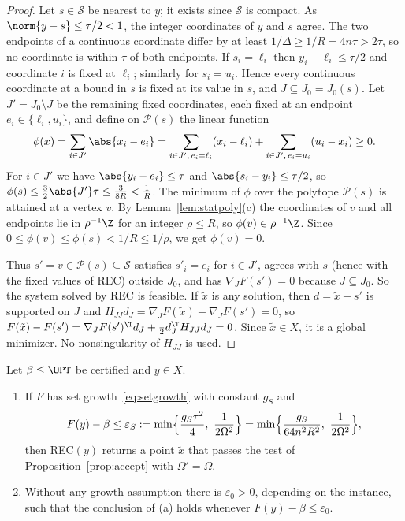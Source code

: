 \begin{proof}
Let $s\in\mathcal S$ be nearest to $y$; it exists since $\mathcal S$ is
compact. As $\norm{y-s}\le\tau/2<1$, the integer coordinates of $y$ and $s$
agree. The two endpoints of a continuous coordinate differ by at least
$1/\Delta\ge1/R=4n\tau>2\tau$, so no coordinate is within $\tau$ of both
endpoints. If $s_i=\ell_i$ then $y_i-\ell_i\le\tau/2$ and coordinate $i$ is
fixed at $\ell_i$; similarly for $s_i=u_i$. Hence every continuous coordinate
at a bound in $s$ is fixed at its value in $s$, and $J\subseteq J_0=J_0(s)$.
Let $J'=J_0\setminus J$ be the remaining fixed coordinates, each fixed at an
endpoint $e_i\in\{\ell_i,u_i\}$, and define on $\mathcal P(s)$ the linear
function
\[
\phi(x)=\sum_{i\in J'}\abs{x_i-e_i}
=\sum_{i\in J',\,e_i=\ell_i}(x_i-\ell_i)+\sum_{i\in J',\,e_i=u_i}(u_i-x_i)\ge0 .
\]
For $i\in J'$ we have $\abs{y_i-e_i}\le\tau$ and $\abs{s_i-y_i}\le\tau/2$, so
$\phi(s)\le\frac32\abs{J'}\tau\le\frac3{8R}<\frac1R$. The minimum of $\phi$
over the polytope $\mathcal P(s)$ is attained at a vertex $v$. By
Lemma~\ref{lem:statpoly}(c) the coordinates of $v$ and all endpoints lie in
$\rho^{-1}\Z$ for an integer $\rho\le R$, so $\phi(v)\in\rho^{-1}\Z$.
Since $0\le\phi(v)\le\phi(s)<1/R\le1/\rho$, we get $\phi(v)=0$.

Thus $s'=v\in\mathcal P(s)\subseteq\mathcal S$ satisfies $s'_i=e_i$ for
$i\in J'$, agrees with $s$ (hence with the fixed values of REC) outside $J_0$,
and has $\nabla_JF(s')=0$ because $J\subseteq J_0$. So the system solved by
REC is feasible. If $\tilde x$ is any solution, then $d=\tilde x-s'$ is
supported on $J$ and $H_{JJ}d_J=\nabla_JF(\tilde x)-\nabla_JF(s')=0$, so
$F(\tilde x)-F(s')=\nabla_JF(s')^{\T}d_J+\frac12d_J^{\T}H_{JJ}d_J=0$.
Since $\tilde x\in X$, it is a global minimizer. No nonsingularity of
$H_{JJ}$ is used.
\end{proof}

\begin{theorem}\label{thm:transfer}
Let $\beta\le\OPT$ be certified and $y\in X$.
\begin{enumerate}[label=(\alph*)]
\item If $F$ has set growth~\eqref{eq:setgrowth} with constant $g_S$ and
\begin{equation}\label{eq:transfer-threshold}
F(y)-\beta\le\varepsilon_S:=\min\Bigl\{\frac{g_S\tau^2}{4},\
\frac1{2\Omega^2}\Bigr\}
=\min\Bigl\{\frac{g_S}{64n^2R^2},\ \frac1{2\Omega^2}\Bigr\},
\end{equation}
then REC$(y)$ returns a point $\tilde x$ that passes the test of
Proposition~\ref{prop:accept} with $\Omega'=\Omega$.
\item Without any growth assumption there is $\varepsilon_0>0$, depending on
the instance, such that the conclusion of (a) holds whenever
$F(y)-\beta\le\varepsilon_0$.
\end{enumerate}
\end{theorem}

